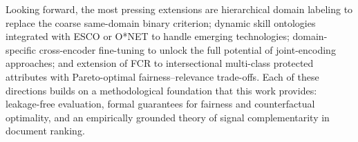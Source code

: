 \documentclass{llncs}
\begin{document}
Looking forward, the most pressing extensions are hierarchical domain labeling to replace the coarse same-domain binary criterion; dynamic skill ontologies integrated with ESCO or O*NET to handle emerging technologies; domain-specific cross-encoder fine-tuning to unlock the full potential of joint-encoding approaches; and extension of FCR to intersectional multi-class protected attributes with Pareto-optimal fairness--relevance trade-offs. Each of these directions builds on a methodological foundation that this work provides: leakage-free evaluation, formal guarantees for fairness and counterfactual optimality, and an empirically grounded theory of signal complementarity in document ranking.



\end{document}
